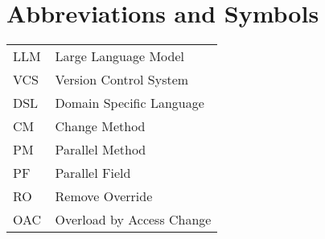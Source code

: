 \chapter*{Abbreviations and Symbols}

\begin{flushleft}
\begin{tabular}{l p{0.8\linewidth}}
LLM      & Large Language Model\\
VCS     & Version Control System\\
DSL     & Domain Specific Language\\
CM      & Change Method\\
PM      & Parallel Method\\
PF      & Parallel Field\\
RO      & Remove Override\\
OAC     & Overload by Access Change
\end{tabular}
\end{flushleft}

